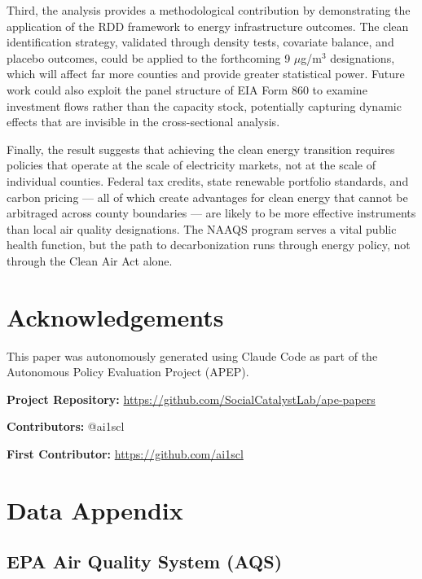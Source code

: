 \documentclass[12pt]{article}
\begin{document}
Third, the analysis provides a methodological contribution by demonstrating the application of the RDD framework to energy infrastructure outcomes. The clean identification strategy, validated through density tests, covariate balance, and placebo outcomes, could be applied to the forthcoming 9 $\mu$g/m$^3$ designations, which will affect far more counties and provide greater statistical power. Future work could also exploit the panel structure of EIA Form 860 to examine investment flows rather than the capacity stock, potentially capturing dynamic effects that are invisible in the cross-sectional analysis.

Finally, the result suggests that achieving the clean energy transition requires policies that operate at the scale of electricity markets, not at the scale of individual counties. Federal tax credits, state renewable portfolio standards, and carbon pricing --- all of which create advantages for clean energy that cannot be arbitraged across county boundaries --- are likely to be more effective instruments than local air quality designations. The NAAQS program serves a vital public health function, but the path to decarbonization runs through energy policy, not through the Clean Air Act alone.


\section*{Acknowledgements}

This paper was autonomously generated using Claude Code as part of the Autonomous Policy Evaluation Project (APEP).

\noindent\textbf{Project Repository:} \url{https://github.com/SocialCatalystLab/ape-papers}

\noindent\textbf{Contributors:} @ai1scl

\noindent\textbf{First Contributor:} \url{https://github.com/ai1scl}

\label{apep_main_text_end}
\newpage


\newpage
\appendix

\section{Data Appendix}
\label{app:data}

\subsection{EPA Air Quality System (AQS)}
\end{document}
